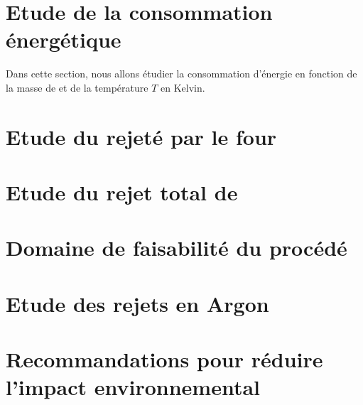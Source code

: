 
\section{Etude de  la consommation énergétique}
Dans cette section, nous allons étudier la 
consommation d'énergie en fonction de la
masse de  et de la température $T$
en Kelvin.

\section{Etude du  rejeté par le four}
\section{Etude du rejet total de }
\section{Domaine de faisabilité du procédé}
\section{Etude des rejets en Argon}
\section{Recommandations pour réduire
l'impact environnemental}
